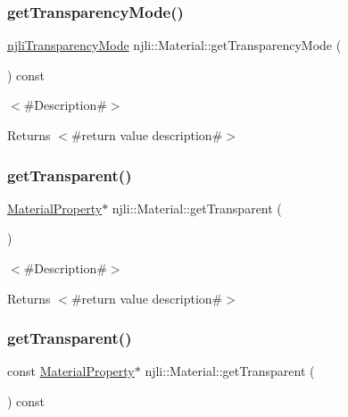 \subsubsection{\texorpdfstring{get\+Transparency\+Mode()}{getTransparencyMode()}}
{\footnotesize\ttfamily \mbox{\hyperlink{namespacenjli_ae6563db51402a0e02a3e55ef556afdd9}{njli\+Transparency\+Mode}} njli\+::\+Material\+::get\+Transparency\+Mode (\begin{DoxyParamCaption}{ }\end{DoxyParamCaption}) const}

$<$\#\+Description\#$>$

\begin{DoxyReturn}{Returns}
$<$\#return value description\#$>$ 
\end{DoxyReturn}
\mbox{\label{classnjli_1_1_material_aeef9185aafbc38792815114a57cb8078}} 
\subsubsection{\texorpdfstring{get\+Transparent()}{getTransparent()}\hspace{0.1cm}{\footnotesize\ttfamily [1/2]}}
{\footnotesize\ttfamily \mbox{\hyperlink{classnjli_1_1_material_property}{Material\+Property}}$\ast$ njli\+::\+Material\+::get\+Transparent (\begin{DoxyParamCaption}{ }\end{DoxyParamCaption})}

$<$\#\+Description\#$>$

\begin{DoxyReturn}{Returns}
$<$\#return value description\#$>$ 
\end{DoxyReturn}
\mbox{\label{classnjli_1_1_material_a6270106430360cfd995e94d206c397d7}} 
\subsubsection{\texorpdfstring{get\+Transparent()}{getTransparent()}\hspace{0.1cm}{\footnotesize\ttfamily [2/2]}}
{\footnotesize\ttfamily const \mbox{\hyperlink{classnjli_1_1_material_property}{Material\+Property}}$\ast$ njli\+::\+Material\+::get\+Transparent (\begin{DoxyParamCaption}{ }\end{DoxyParamCaption}) const}

